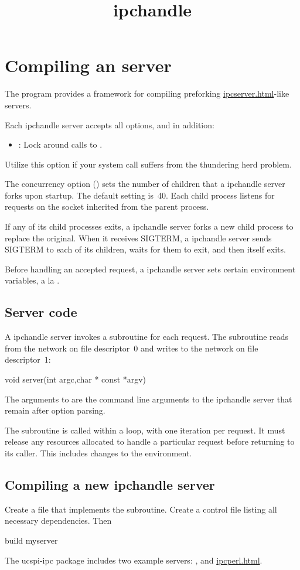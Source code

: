 \documentclass{book}
\title{ipchandle}
\begin{document}
\section{Compiling an  server}

The  program provides a framework for compiling
preforking
\href{\cmd{ipcserver}}{ipcserver.html}-like servers.

Each ipchandle server accepts all  options, and
in addition:
\begin{itemize}
  \item {}:
    Lock  around calls to .
\end{itemize}
Utilize this option if your  system call suffers from the
thundering herd problem.

The concurrency option () sets the number of children that a
ipchandle server forks upon startup.  The default setting is~40.  Each
child process listens for requests on the socket inherited from the
parent process.

If any of its child processes exits, a ipchandle server forks a new
child process to replace the original.  When it receives SIGTERM, a
ipchandle server sends SIGTERM to each of its children, waits for them
to exit, and then itself exits.

Before handling an accepted request, a ipchandle server sets certain
environment variables, a la .

\subsection{Server code}
A ipchandle server invokes a  subroutine for each request.
The subroutine reads from the network on file descriptor~0 and writes to
the network on file descriptor~1:
\begin{code}%
  void server(int argc,char * const *argv)
\end{code}
The arguments to  are the command line arguments to the
ipchandle server that remain after option parsing.

The  subroutine is called within a loop, with one iteration
per request.  It must release any resources allocated to handle a
particular request before returning to its caller.  This includes
changes to the environment.

\subsection{Compiling a new ipchandle server}
Create a file  that implements the 
subroutine.  Create a control file  listing all
necessary dependencies.  Then
\begin{code}%
  build myserver
\end{code}

The ucspi-ipc package includes two example servers: , and
\href{\cmd{ipcperl}}{ipcperl.html}.
\end{document}
